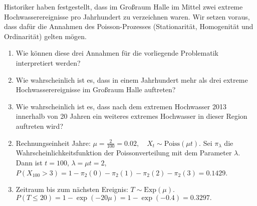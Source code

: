  Historiker haben festgestellt, dass im
Großraum Halle im Mittel zwei extreme Hochwasserereignisse pro Jahrhundert zu
verzeichnen waren. Wir setzen voraus, dass dafür die Annahmen des
Poisson-Prozesses (Stationarität, Homogenität und Ordinarität) gelten mögen.
\begin{enumerate}
    \item Wie können diese drei Annahmen für die vorliegende Problematik interpretiert werden?
        
    \item Wie wahrscheinlich ist es, dass in einem Jahrhundert mehr als drei
        extreme Hochwasserereignisse im Großraum Halle auftreten?
    \item Wie wahrscheinlich ist es, dass nach dem extremen Hochwasser 2013
        innerhalb von 20 Jahren ein weiteres extremes Hochwasser in dieser
        Region auftreten wird?  
\end{enumerate}

\solution
\begin{enumerate}
        \setcounter{enumi}{1}
    \item Rechnungseinheit Jahre: $\mu=\frac{2}{100}=0.02, \quad X_t \sim \text{Poiss}(\mu t).$ 
        Sei $\pi_{\lambda}$ die Wahrscheinlichkeitsfunktion der Poissonverteilung mit dem Parameter $\lambda$. Dann ist
        $t=100$, $\lambda=\mu t=2$, $P(X_{100}>3)=1-\pi_2(0)-\pi_2(1)-\pi_2(2)-\pi_2(3)= 0.1429$.
    \item Zeitraum bis zum nächsten Ereignis: $T \sim \text{Exp}(\mu)$.
        $P(T \le 20)=1-\exp(-20 \mu)=1-\exp(-0.4)=0.3297.$
\end{enumerate}

%        
%
%



